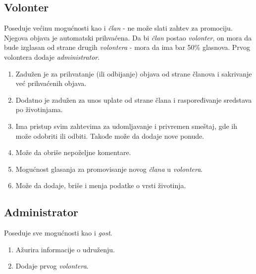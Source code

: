 \subsection{Volonter} 
    \par Poseduje većinu mogućnosti kao i \textit{član} - ne može slati zahtev za promociju. Njegova objava je automatski prihvaćena. 
    Da bi \textit{član} postao \textit{volonter}, on mora da bude izglasan od strane drugih \textit{volontera} - mora da ima bar 50\% glasnova. 
    Prvog volontera dodaje \textit{administrator}. 
    \begin{enumerate}
        \item Zadužen je za prihvatanje (ili odbijanje) objava od strane članova i sakrivanje već prihvaćenih objava.
        \item Dodatno je zadužen za unos uplate od strane člana i raspoređivanje sredstava po životinjama.
        \item Ima pristup svim zahtevima za udomljavanje i privremen smeštaj, gde ih može odobriti ili odbiti. Takođe može da dodaje nove ponude.
        \item Može da obriše nepoželjne komentare.
        \item Mogućnost glasanja za promovisanje novog \textit{člana} u \textit{volontera}.
        \item Može da dodaje, briše i menja podatke o vrsti životinja.
    \end{enumerate}
\subsection{Administrator}
    \par Poseduje sve mogućnosti kao i \textit{gost}. 
    \begin{enumerate}
        \item Ažurira informacije o udruženju. 
        \item Dodaje prvog \textit{volontera}.
    \end{enumerate}
    